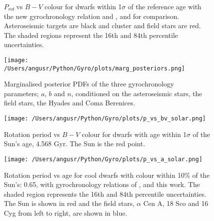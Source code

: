 \documentclass[11pt,preprint]{aastex}
\newcommand{\prot}{$P_{rot}~$}
\begin{document}
\begin{figure}[ht]
\begin{center}
    \end{center}
    \caption{ \prot vs $B-V$ colour for dwarfs within 1$\sigma$ of the reference age with the new gyrochronology relation and \citet{Barnes2007}, and \citet{Mamajek2008} for comparison. Asteroseismic targets are black and cluster and field stars are red. The shaded regions represent the 16th and 84th percentile uncertainties.
     }
   \label{fig:subfigures2}
\end{figure}

\begin{figure}[ht]
\begin{center}
\texttt{[image: /Users/angusr/Python/Gyro/plots/marg\_posteriors.png]}
\caption{Marginalised posterior PDFs of the three gyrochronology parameters; $a$, $b$ and $n$, conditioned on the asteroseismic stars, the field stars, the Hyades and Coma Berenices.}
\label{fig:marg_posteriors}
\end{center}
\end{figure}

\begin{figure}[ht]
\begin{center}
\texttt{[image: /Users/angusr/Python/Gyro/plots/p\_vs\_bv\_solar.png]}
\caption{Rotation period vs $B-V$ colour for dwarfs with age within 1$\sigma$ of the Sun's age, 4.568 Gyr. The Sun is the red point.}
\label{fig:p_vs_bv_solar}
\end{center}
\end{figure}

\begin{figure}[ht]
\begin{center}
\texttt{[image: /Users/angusr/Python/Gyro/plots/p\_vs\_a\_solar.png]}
\caption{Rotation period vs age for cool dwarfs with colour within 10\% of the Sun's: 0.65, with gyrochronology relations of \citet{Barnes2007}, \citet{Mamajek2008} and this work. The shaded region represents the 16th and 84th percentile uncertainties. The Sun is shown in red and the field stars, $\alpha$ Cen A, 18 Sco and 16 Cyg from left to right, are shown in blue.}
\label{fig:p_vs_a_solar}
\end{center}
\end{figure}
\end{document}
